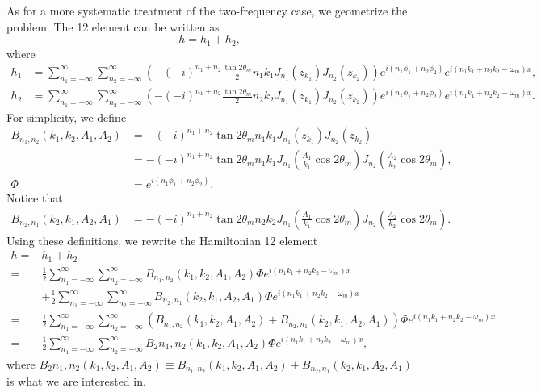 As for a more systematic treatment of the two-frequency case, we geometrize the problem. The 12 element can be written as
\begin{equation}
   h = h_1 + h_2, 
\end{equation}
where
\begin{align}
   h_1 &=\sum_{n_1=-\infty}^\infty \sum_{n_2=-\infty}^{\infty}\left( -(-i)^{n_1+n_2}\frac{\tan 2\theta_m}{2} n_1 k_1 J_{n_1}(z_{k_1}) J_{n_2}(z_{k_2})  \right) e^{i(n_1\phi_1+n_2\phi_2)} e^{i(n_1 k_1 + n_2 k_2 - \omega_m)x}, \nonumber\\
   h_2 &=\sum_{n_1=-\infty}^\infty \sum_{n_2=-\infty}^{\infty}\left( -(-i)^{n_1+n_2}\frac{\tan 2\theta_m}{2} n_2 k_2 J_{n_1}(z_{k_1}) J_{n_2}(z_{k_2})  \right) e^{i(n_1\phi_1+n_2\phi_2)} e^{i(n_1 k_1 + n_2 k_2 - \omega_m)x}. \nonumber
\end{align}
For simplicity, we define
\begin{align}
   B_{n_1,n_2}(k_1,k_2,A_1,A_2) &= -(-i)^{n_1+n_2} \tan 2\theta_m n_1 k_1 J_{n_1}(z_{k_1}) J_{n_2}(z_{k_2}) \nonumber\\
   &= -(-i)^{n_1+n_2} \tan 2\theta_m n_1 k_1 J_{n_1}(\frac{A_1}{k_1}\cos 2\theta_m) J_{n_2}(\frac{A_2}{k_2}\cos 2\theta_m)  , \nonumber\\
   \Phi & = e^{i(n_1\phi_1+n_2\phi_2)}.\nonumber
\end{align}
Notice that
\begin{align}
   B_{n_2,n_1}(k_2,k_1, A_2, A_1) &= -(-i)^{n_1+n_2} \tan 2\theta_m n_2 k_2 J_{n_1}( \frac{A_1}{k_1}\cos 2\theta_m ) J_{n_2}( \frac{A_2}{k_2}\cos 2\theta_m ).\nonumber
\end{align}
Using these definitions, we rewrite the Hamiltonian 12 element
\begin{align}
   h =& h_1 + h_2 \\
    =& \frac{1}{2}\sum_{n_1=-\infty}^\infty \sum_{n_2=-\infty}^{\infty} B_{n_1,n_2}(k_1,k_2,A_1,A_2) \Phi e^{i(n_1 k_1 + n_2 k_2 - \omega_m)x} \nonumber\\
   &+  \frac{1}{2}\sum_{n_1=-\infty}^\infty \sum_{n_2=-\infty}^{\infty} B_{n_2,n_1}(k_2,k_1,A_2,A_1) \Phi e^{i(n_1 k_1 + n_2 k_2 - \omega_m)x}  \nonumber\\
    =& \frac{1}{2}\sum_{n_1=-\infty}^\infty \sum_{n_2=-\infty}^{\infty} \left( B_{n_1,n_2}(k_1,k_2,A_1,A_2) + B_{n_2,n_1}(k_2,k_1,A_2,A_1) \right) \Phi e^{i(n_1 k_1 + n_2 k_2 - \omega_m)x}  \nonumber\\
    =& \frac{1}{2}\sum_{n_1=-\infty}^\infty \sum_{n_2=-\infty}^{\infty} B_2{n_1,n_2}(k_1,k_2,A_1,A_2)\Phi e^{i(n_1 k_1 + n_2 k_2 - \omega_m)x},
   \label{chap:matter-sec:jacobi-subsec:multi-matter-freq-eqn:2-freq-hamiltonian-12-element}
\end{align}
where $B_2{n_1,n_2}(k_1,k_2,A_1,A_2)\equiv B_{n_1,n_2}(k_1,k_2,A_1,A_2) + B_{n_2,n_1}(k_2,k_1,A_2,A_1)$ is what we are interested in.

